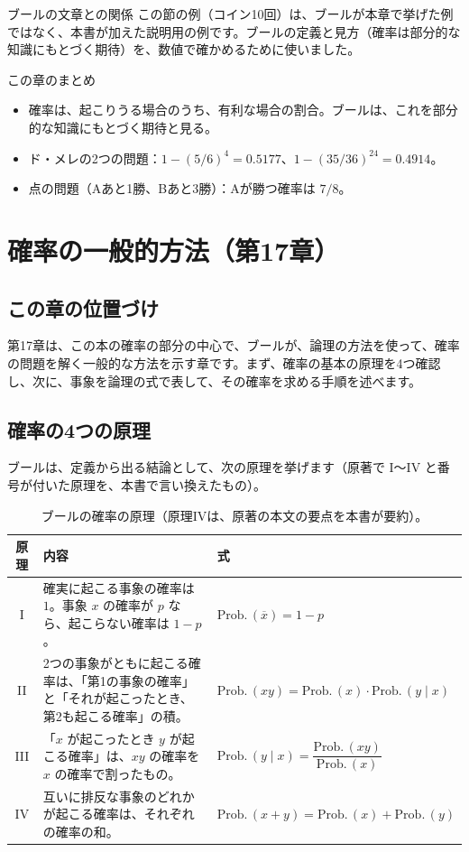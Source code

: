 \documentclass[a4paper,11pt,openany]{ltjsbook}
\newcommand{\nx}[1]{\overline{#1}}
\newcommand{\Prob}{\mathrm{Prob.}\,}
\begin{document}
\begin{notebox}{ブールの文章との関係}
この節の例（コイン10回）は、ブールが本章で挙げた例ではなく、本書が加えた説明用の例です。ブールの定義と見方（確率は部分的な知識にもとづく期待）を、数値で確かめるために使いました。
\end{notebox}

\begin{pointbox}{この章のまとめ}
\begin{itemize}[leftmargin=*]
\item 確率は、起こりうる場合のうち、有利な場合の割合。ブールは、これを部分的な知識にもとづく期待と見る。
\item ド・メレの2つの問題：$1-(5/6)^4=0.5177$、$1-(35/36)^{24}=0.4914$。
\item 点の問題（Aあと1勝、Bあと3勝）：Aが勝つ確率は $7/8$。
\end{itemize}
\end{pointbox}

\chapter{確率の一般的方法（第17章）}

\section{この章の位置づけ}

第17章は、この本の確率の部分の中心で、ブールが、論理の方法を使って、確率の問題を解く一般的な方法を示す章です。まず、確率の基本の原理を4つ確認し、次に、事象を論理の式で表して、その確率を求める手順を述べます。

\section{確率の4つの原理}

ブールは、定義から出る結論として、次の原理を挙げます（原著で I〜IV と番号が付いた原理を、本書で言い換えたもの）。

\begin{table}[htbp]
\centering
\small
\begin{tabular}{cp{6.4cm}p{4.2cm}}
\toprule
原理 & 内容 & 式\\
\midrule
I & 確実に起こる事象の確率は $1$。事象 $x$ の確率が $p$ なら、起こらない確率は $1-p$。 & $\Prob(\nx x)=1-p$\\
II & 2つの事象がともに起こる確率は、「第1の事象の確率」と「それが起こったとき、第2も起こる確率」の積。 & $\Prob(xy)=\Prob(x)\cdot\Prob(y\mid x)$\\
III & 「$x$ が起こったとき $y$ が起こる確率」は、$xy$ の確率を $x$ の確率で割ったもの。 & $\Prob(y\mid x)=\dfrac{\Prob(xy)}{\Prob(x)}$\\
IV & 互いに排反な事象のどれかが起こる確率は、それぞれの確率の和。 & $\Prob(x+y)=\Prob(x)+\Prob(y)$\\
\bottomrule
\end{tabular}
\caption{ブールの確率の原理（原理IVは、原著の本文の要点を本書が要約）。}
\end{table}
\end{document}
